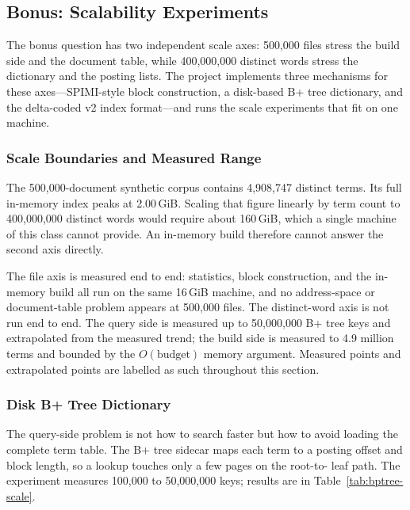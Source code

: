 
\subsection{Bonus: Scalability Experiments}
\label{sec:bonus}

The bonus question has two independent scale axes: 500,000 files stress the
build side and the document table, while 400,000,000 distinct words stress the
dictionary and the posting lists. The project implements three mechanisms for
these axes---SPIMI-style block construction, a disk-based B+ tree dictionary,
and the delta-coded v2 index format---and runs the scale experiments that fit
on one machine.

\subsubsection{Scale Boundaries and Measured Range}
\label{sec:scale-range}

The 500,000-document synthetic corpus contains 4,908,747 distinct terms. Its
full in-memory index peaks at 2.00\,GiB. Scaling that figure linearly by term
count to 400,000,000 distinct words would require about 160\,GiB, which a
single machine of this class cannot provide. An in-memory build therefore
cannot answer the second axis directly.

The file axis is measured end to end: statistics, block construction, and the
in-memory build all run on the same 16\,GiB machine, and no address-space or
document-table problem appears at 500,000 files. The distinct-word axis is not
run end to end. The query side is measured up to 50,000,000 B+ tree keys and
extrapolated from the measured trend; the build side is measured to 4.9
million terms and bounded by the $O(\text{budget})$ memory argument. Measured
points and extrapolated points are labelled as such throughout this section.

\subsubsection{Disk B+ Tree Dictionary}
\label{sec:bptree-results}

The query-side problem is not how to search faster but how to avoid loading
the complete term table. The B+ tree sidecar maps each term to a posting
offset and block length, so a lookup touches only a few pages on the root-to-
leaf path. The experiment measures 100,000 to 50,000,000 keys; results are in
Table~\ref{tab:bptree-scale}.

